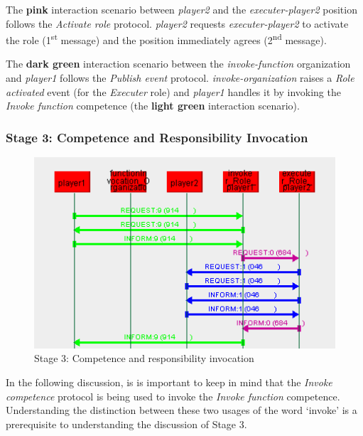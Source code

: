 The \textbf{pink} interaction scenario between \textit{player2} and the \textit{executer-player2} position follows the \textit{Activate role} protocol.
\textit{player2} requests \textit{executer-player2} to activate the role (1\textsuperscript{st} message) and the position immediately agrees (2\textsuperscript{nd} message).

The \textbf{dark green} interaction scenario between the \textit{invoke-function} organization and \textit{player1} follows the \textit{Publish event} protocol.
\textit{invoke-organization} raises a \textit{Role activated} event (for the \textit{Executer} role) and \textit{player1} handles it by invoking the \textit{Invoke function} competence (the \textbf{light green} interaction scenario).

\subsubsection*{Stage 3: Competence and Responsibility Invocation}

\begin{figure}[H]
	\centering
	\includegraphics[width=\textwidth]{images/example1-stage3.png}
	\caption{Stage 3: Competence and responsibility invocation}
	\label{figure:example1-stage3}
\end{figure}

In the following discussion, is is important to keep in mind that the \textit{Invoke competence} protocol is being used to invoke the \textit{Invoke function} competence.
Understanding the distinction between these two usages of the word `invoke' is a prerequisite to understanding the discussion of Stage 3.

